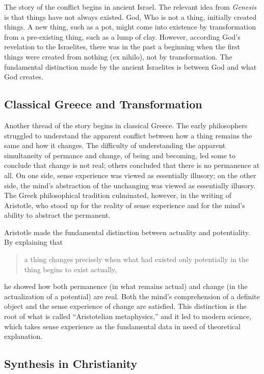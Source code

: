 \documentclass[twocolumn]{article}
\begin{document}
The story of the conflict begins in ancient Israel.  The relevant idea from
{\it Genesis} is that things have not always existed.  God, Who is not a thing,
initially created things.  A new thing, such as a pot, might come into
existence by transformation from a pre-existing thing, such as a lump of clay.
However, according God's revelation to the Israelites, there was in the past a
beginning when the first things were created from nothing (ex nihilo), not by
transformation.  The fundamental distinction made by the ancient Israelites is
between God and what God creates.

\subsection{Classical Greece and Transformation}

Another thread of the story begins in classical Greece.  The early philosophers
struggled to understand the apparent conflict between how a thing remains the
same and how it changes.  The difficulty of understanding the apparent
simultaneity of permance and change, of being and becoming, led some to
conclude that change is not real; others concluded that there is no permanence
at all.  On one side, sense experience was viewed as essentially illusory; on
the other side, the mind's abstraction of the unchanging was viewed as
essentially illusory.  The Greek philosophical tradition culminated, however,
in the writing of Aristotle, who stood up for the reality of sense experience
and for the mind's ability to abstract the permanent.

Aristotle made the fundamental distinction between actuality and potentiality.
By explaining that
\begin{quote}
   a thing changes precisely when what had existed only potentially in the
   thing begins to exist actually,
\end{quote}
he showed how both permanence (in what remains actual) and change (in the
actualization of a potential) are real. Both the mind's comprehension of a
definite object and the sense experience of change are satisfied.  This
distinction is the root of what is called ``Aristotelian metaphysics,'' and it
led to modern science, which takes sense experience as the fundamental data in
need of theoretical explanation.

\subsection{Synthesis in Christianity}
\end{document}
